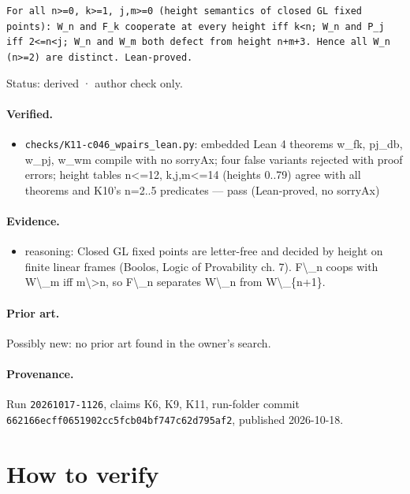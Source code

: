 \documentclass{article}
\begin{document}
\texttt{For all n\textgreater{}=0, k\textgreater{}=1, j,m\textgreater{}=0 (height semantics of closed GL fixed points): W\_n and F\_k cooperate at every height iff k\textless{}n; W\_n and P\_j iff 2\textless{}=n\textless{}j; W\_n and W\_m both defect from height n+m+3. Hence all W\_n (n\textgreater{}=2) are distinct. Lean-proved.}

Status: derived · author check only.

\paragraph{Verified.}
\begin{itemize}
\item \texttt{checks/K11-c046\_wpairs\_lean.py}: embedded Lean 4 theorems w\_fk, pj\_db, w\_pj, w\_wm compile with no sorryAx; four false variants rejected with proof errors; height tables n\textless{}=12, k,j,m\textless{}=14 (heights 0..79) agree with all theorems and K10's n=2..5 predicates --- pass (Lean-proved, no sorryAx)
\end{itemize}

\paragraph{Evidence.}
\begin{itemize}
\item reasoning: Closed GL fixed points are letter-free and decided by height on finite linear frames (Boolos, Logic of Provability ch. 7). F\textbackslash{}\_n coops with W\textbackslash{}\_m iff m\textbackslash{}\textgreater{}n, so F\textbackslash{}\_n separates W\textbackslash{}\_n from W\textbackslash{}\_\{n+1\}.
\end{itemize}

\paragraph{Prior art.} Possibly new: no prior art found in the owner's search.

\paragraph{Provenance.}
Run \texttt{20261017-1126}, claims K6, K9, K11, run-folder commit \texttt{662166ecff0651902cc5fcb04bf747c62d795af2}, published 2026-10-18.

\section{How to verify}
\end{document}

